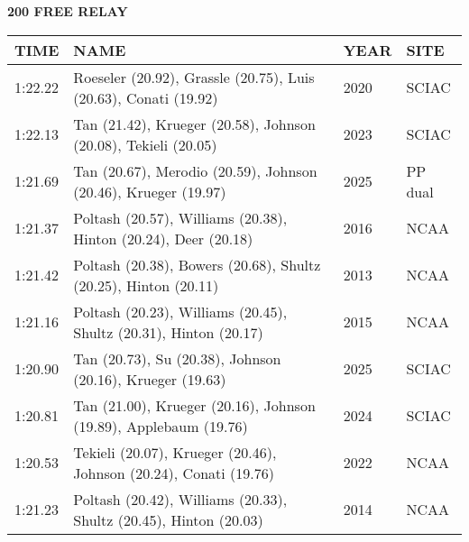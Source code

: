 \vspace{0.4cm}

\begin{center}
\begin{minipage}[t]{0.7\textwidth}
\centering
\textbf{200 FREE RELAY}\\[0.05cm]
\begin{tabular}{@{}p{1.8cm}p{2.8cm}p{1.2cm}p{1.4cm}@{}}
\hline
\textbf{TIME} & \textbf{NAME} & \textbf{YEAR} & \textbf{SITE} \\
\hline
1:22.22 & Roeseler (20.92), Grassle (20.75), Luis (20.63), Conati (19.92) & 2020 & SCIAC \\
1:22.13 & Tan (21.42), Krueger (20.58), Johnson (20.08), Tekieli (20.05) & 2023 & SCIAC \\
1:21.69 & Tan (20.67), Merodio (20.59), Johnson (20.46), Krueger (19.97) & 2025 & PP dual \\
1:21.37 & Poltash (20.57), Williams (20.38), Hinton (20.24), Deer (20.18) & 2016 & NCAA \\
1:21.42 & Poltash (20.38), Bowers (20.68), Shultz (20.25), Hinton (20.11) & 2013 & NCAA \\
1:21.16 & Poltash (20.23), Williams (20.45), Shultz (20.31), Hinton (20.17) & 2015 & NCAA \\
1:20.90 & Tan (20.73), Su (20.38), Johnson (20.16), Krueger (19.63) & 2025 & SCIAC \\
1:20.81 & Tan (21.00), Krueger (20.16), Johnson (19.89), Applebaum (19.76) & 2024 & SCIAC \\
1:20.53 & Tekieli (20.07), Krueger (20.46), Johnson (20.24), Conati (19.76) & 2022 & NCAA \\
1:21.23 & Poltash (20.42), Williams (20.33), Shultz (20.45), Hinton (20.03) & 2014 & NCAA \\
\hline
\end{tabular}
\end{minipage}
\end{center}

\vspace{0.4cm}

